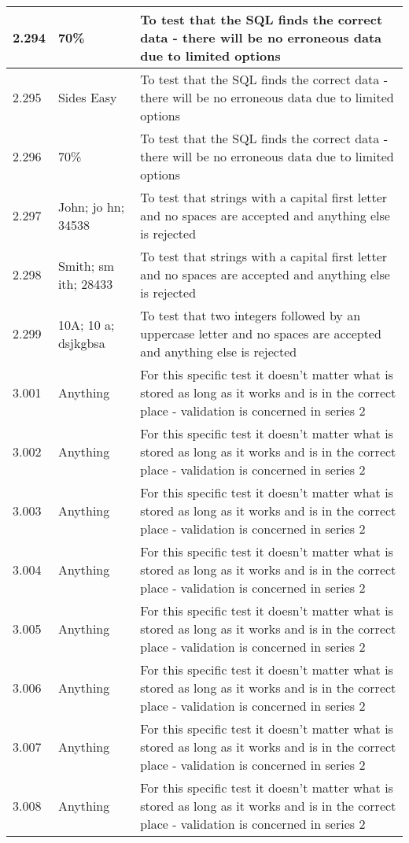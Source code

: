 \begin{landscape}
\begin{center}
\begin{longtable}{|p{4cm}|p{4cm}|p{5cm}|}
2.294 & 70\% & To test that the SQL finds the correct data - there will be no erroneous data due to limited options \\ \hline
2.295 & Sides Easy & To test that the SQL finds the correct data - there will be no erroneous data due to limited options \\ \hline
2.296 & 70\% & To test that the SQL finds the correct data - there will be no erroneous data due to limited options \\ \hline
2.297 & John; jo hn; 34538 & To test that strings with a capital first letter and no spaces are accepted and anything else is rejected \\ \hline
2.298 & Smith; sm ith; 28433 & To test that strings with a capital first letter and no spaces are accepted and anything else is rejected \\ \hline
2.299 & 10A; 10 a; dsjkgbsa & To test that two integers followed by an uppercase letter and no spaces are accepted and anything else is rejected \\ \hline
3.001 & Anything & For this specific test it doesn't matter what is stored as long as it works and is in the correct place - validation is concerned in series 2 \\ \hline
3.002 & Anything & For this specific test it doesn't matter what is stored as long as it works and is in the correct place - validation is concerned in series 2 \\ \hline
3.003 & Anything & For this specific test it doesn't matter what is stored as long as it works and is in the correct place - validation is concerned in series 2 \\ \hline
3.004 & Anything & For this specific test it doesn't matter what is stored as long as it works and is in the correct place - validation is concerned in series 2 \\ \hline 
3.005 & Anything & For this specific test it doesn't matter what is stored as long as it works and is in the correct place - validation is concerned in series 2 \\ \hline
3.006 & Anything & For this specific test it doesn't matter what is stored as long as it works and is in the correct place - validation is concerned in series 2 \\ \hline
3.007 & Anything & For this specific test it doesn't matter what is stored as long as it works and is in the correct place - validation is concerned in series 2 \\ \hline
3.008 & Anything & For this specific test it doesn't matter what is stored as long as it works and is in the correct place - validation is concerned in series 2 \\ \hline

\end{longtable}
\end{center}
\end{landscape}

